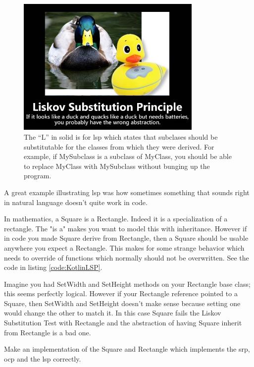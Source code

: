 \begin{figure}
	\centering
	\includegraphics[width=0.8\textwidth]{images/kotlin/LSP.jpg}
	\caption{The “L” in \gls{solid} is for \gls{lsp} which states that subclases should be substitutable for the classes from which they were derived.
		For example, if MySubclass is a subclass of MyClass, you should be able to replace MyClass with MySubclass without bunging up the program.}
	\label{fir:LSP}
\end{figure}

A great example illustrating \gls{lsp}  was how sometimes something that sounds right in natural language doesn't quite work in code.

In mathematics, a Square is a Rectangle.
Indeed it is a specialization of a rectangle.
The "is a" makes you want to model this with inheritance.
However if in code you made Square derive from Rectangle, then a Square should be usable anywhere you expect a Rectangle.
This makes for some strange behavior which needs to override of functions which normally should not be overwritten.
See the code in listing \ref{code:KotlinLSP}.



Imagine you had SetWidth and SetHeight methods on your Rectangle base class; this seems perfectly logical.
However if your Rectangle reference pointed to a Square, then SetWidth and SetHeight doesn't make sense because setting one would change the other to match it.
In this case Square fails the Liskov Substitution Test with Rectangle and the abstraction of having Square inherit from Rectangle is a bad one.

\begin{exercise}
	Make an implementation of the Square and Rectangle which implements the \gls{srp},  \gls{ocp}  and the \gls{lsp} correctly. 
\end{exercise}

